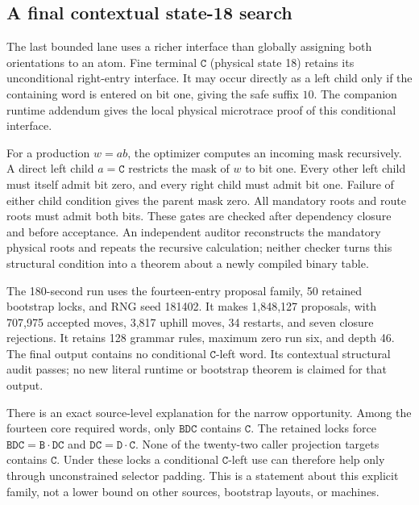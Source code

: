 \subsection{A final contextual state-18 search}

The last bounded lane uses a richer interface than globally assigning both
orientations to an atom. Fine terminal $\mathtt C$ (physical state 18) retains
its unconditional right-entry interface. It may occur directly as a left
child only if the containing word is entered on bit one, giving the safe
suffix $10$. The companion runtime addendum gives the local physical
microtrace proof of this conditional interface.

For a production $w=ab$, the optimizer computes an incoming mask recursively.
A direct left child $a=\mathtt C$ restricts the mask of $w$ to bit one.
Every other left child must itself admit bit zero, and every right child must
admit bit one. Failure of either child condition gives the parent mask zero.
All mandatory roots and route roots must admit both bits. These gates are
checked after dependency closure and before acceptance. An independent
auditor reconstructs the mandatory physical roots and repeats the recursive
calculation; neither checker turns this structural condition into a theorem
about a newly compiled binary table.

The 180-second run uses the fourteen-entry proposal family, 50 retained
bootstrap locks, and RNG seed 181402. It makes 1,848,127 proposals, with
707,975 accepted moves, 3,817 uphill moves, 34 restarts, and seven closure
rejections. It retains 128 grammar rules, maximum zero run six, and depth 46.
The final output contains no conditional $\mathtt C$-left word. Its contextual
structural audit passes; no new literal runtime or bootstrap theorem is
claimed for that output.

There is an exact source-level explanation for the narrow opportunity. Among
the fourteen core required words, only $\mathtt{BDC}$ contains $\mathtt C$.
The retained locks force $\mathtt{BDC}=\mathtt B\cdot\mathtt{DC}$ and
$\mathtt{DC}=\mathtt D\cdot\mathtt C$. None of the twenty-two caller
projection targets contains $\mathtt C$. Under these locks a conditional
$\mathtt C$-left use can therefore help only through unconstrained selector
padding. This is a statement about this explicit family, not a lower bound
on other sources, bootstrap layouts, or machines.
